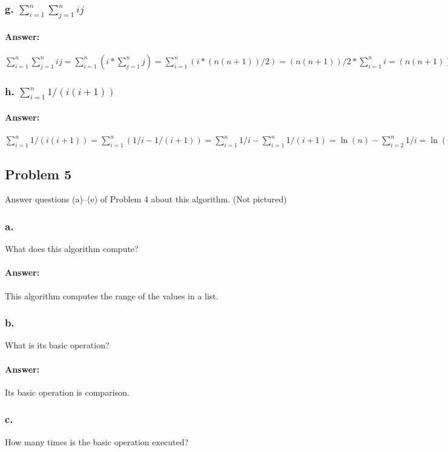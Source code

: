 \documentclass{article}
\begin{document}
  \subsubsection{g. $\sum\limits_{i=1}^{n} \sum\limits_{j=1}^n ij$}
    \paragraph{Answer: \newline}
      $\sum\limits_{i=1}^{n} \sum\limits_{j=1}^n ij = \sum\limits_{i=1}^{n} (i*\sum\limits_{j=1}^n j) =
      \sum\limits_{i=1}^{n} (i * (n(n+1))/2) = (n(n+1))/2 * \sum\limits_{i=1}^{n} i = (n(n+1))/2 * (n(n+1))/2 = ((n(n+1))/2)^2$
  \subsubsection{h. $\sum\limits_{i=1}^{n} 1/(i(i+1))$}
    \paragraph{Answer: \newline}
      $\sum\limits_{i=1}^{n} 1/(i(i+1)) = \sum\limits_{i=1}^{n}(1/i - 1/(i+1)) = \sum\limits_{i=1}^{n}1/i - \sum\limits_{i=1}^{n}1/(i+1)
      = \ln(n) - \sum\limits_{i=2}^{n}1/i = \ln(n) - (\sum\limits_{i=1}^{n}1/i - \sum\limits_{i=1}^1 \ln(n) - (ln(n) - 1) = 1$
  \subsection{Problem 5}
    Answer questions (a)–(e) of Problem 4 about this algorithm. (Not pictured)
    \subsubsection{a. }
      What does this algorithm compute?
      \paragraph{Answer:}
        This algorithm computes the range of the values in a list.
    \subsubsection{b.}
      What is its basic operation?
      \paragraph{Answer:}
        Its basic operation is comparison.
    \subsubsection{c. }
      How many times is the basic operation executed?
\end{document}
